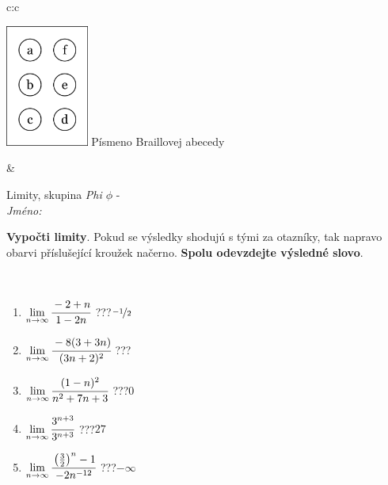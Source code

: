 \documentclass[10pt]{report}
\begin{document}
\begin{tabular}{c:c}
\begin{minipage}[c][104.5mm][t]{0.5\linewidth}
\begin{center}
\begin{minipage}{0.20\linewidth}
\begin{center}
\includegraphics[height=40mm]{../images/braille.png}
{\small Písmeno Braillovej abecedy}
\end{center}
\end{minipage}
\end{center}
\end{minipage}
&
\begin{minipage}[c][104.5mm][t]{0.5\linewidth}
\begin{center}
\vspace{7mm}
{\huge Limity, skupina \textit{Phi $\phi$} -}\\[5mm]
\textit{Jméno:}\phantom{xxxxxxxxxxxxxxxxxxxxxxxxxxxxxxxxxxxxxxxxxxxxxxxxxxxxxxxxxxxxxxxxx}\\[5mm]
\begin{minipage}{0.95\linewidth}
\begin{center}
\textbf{Vypočti limity}. Pokud se výsledky shodujú s tými za otazníky, tak napravo\\obarvi příslušející kroužek načerno. \textbf{Spolu odevzdejte výsledné slovo}.
\end{center}
\end{minipage}
\\[1mm]
\begin{minipage}{0.79\linewidth}
\begin{center}
\begin{varwidth}{\linewidth}
\begin{enumerate}
\normalsize
\item $\lim\limits_{n\to\infty}\cfrac{-2+n}{1-2n}$\quad \dotfill\; ???\;\dotfill \quad $\nicefrac{-1}{2}$
\item $\lim\limits_{n\to\infty}\cfrac{-8(3+3n)}{(3n+2)^2}$\quad \dotfill\; ???\;\dotfill {}
\item $\lim\limits_{n\to\infty}\cfrac{(1-n)^2}{n^2+7n+3}$\quad \dotfill\; ???\;\dotfill \quad $0$
\item $\lim\limits_{n\to\infty}\cfrac{3^{n+3}}{3^{n+3}}$\quad \dotfill\; ???\;\dotfill \quad $27$
\item $\lim\limits_{n\to\infty}\cfrac{\left(\frac{3}{2}\right)^n -1}{-2n^{-12}}$\quad \dotfill\; ???\;\dotfill \quad $-\infty$

\end{enumerate}
\end{varwidth}
\end{center}
\end{minipage}
\end{center}
\end{minipage}
\end{tabular}
\end{document}
